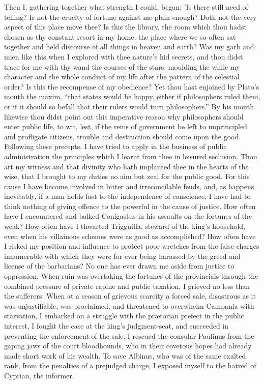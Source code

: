 Then I, gathering together what strength I could, began: 'Is there still
need of telling? Is not the cruelty of fortune against me plain enough?
Doth not the very aspect of this place move thee? Is this the library,
the room which thou hadst chosen as thy constant resort in my home, the
place where we so often sat together and held discourse of all things in
heaven and earth? Was my garb and mien like this when I explored with
thee nature's hid secrets, and thou didst trace for me with thy wand
the courses of the stars, moulding the while my character and the whole
conduct of my life after the pattern of the celestial order? Is this the
recompense of my obedience? Yet thou hast enjoined by Plato's mouth the
maxim, ``that states would be happy, either if philosophers ruled them,
or if it should so befall that their rulers would turn philosophers.'' By
his mouth likewise thou didst point out this imperative reason why
philosophers should enter public life, to wit, lest, if the reins of
government be left to unprincipled and profligate citizens, trouble and
destruction should come upon the good. Following these precepts, I have
tried to apply in the business of public administration the principles
which I learnt from thee in leisured seclusion. Thou art my witness and
that divinity who hath implanted thee in the hearts of the wise, that I
brought to my duties no aim but zeal for the public good. For this cause
I have become involved in bitter and irreconcilable feuds, and, as
happens inevitably, if a man holds fast to the independence of
conscience, I have had to think nothing of giving offence to the
powerful in the cause of justice. How often have I encountered and
balked Conigastus in his assaults on the fortunes of the weak? How often
have I thwarted Trigguilla, steward of the king's household, even when
his villainous schemes were as good as accomplished? How often have I
risked my position and influence to protect poor wretches from the false
charges innumerable with which they were for ever being harassed by the
greed and license of the barbarians? No one has ever drawn me aside from
justice to oppression. When ruin was overtaking the fortunes of the
provincials through the combined pressure of private rapine and public
taxation, I grieved no less than the sufferers. When at a season of
grievous scarcity a forced sale, disastrous as it was unjustifiable, was
proclaimed, and threatened to overwhelm Campania with starvation, I
embarked on a struggle with the prætorian prefect in the public
interest, I fought the case at the king's judgment-seat, and succeeded
in preventing the enforcement of the sale. I rescued the consular
Paulinus from the gaping jaws of the court bloodhounds, who in their
covetous hopes had already made short work of his wealth. To save
Albinus, who was of the same exalted rank, from the penalties of a
prejudged charge, I exposed myself to the hatred of Cyprian, the
informer.

